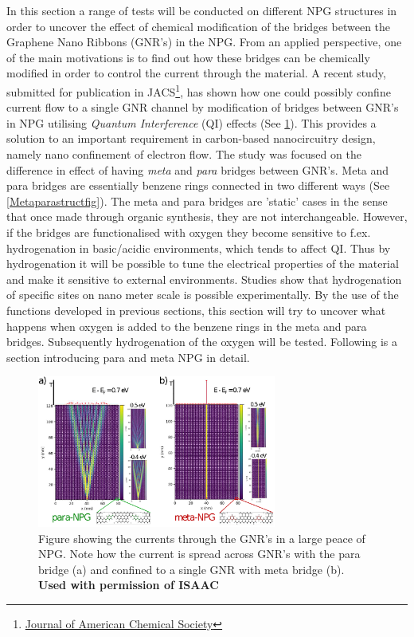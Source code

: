In this section a range of tests will be conducted on different NPG structures in order to uncover the effect of chemical modification of the bridges between the Graphene Nano Ribbons (GNR's) in the NPG. From an applied perspective, one of the main motivations is to find out how these bridges can be chemically modified in order to control the current through the material. A recent study\cite{unpub}, submitted for publication in JACS\footnote{\href{https://pubs.acs.org/journal/jacsat}{Journal of American Chemical Society}}, has shown how one could possibly confine current flow to a single GNR channel by modification of bridges between GNR's in NPG utilising \textit{Quantum Interference} (QI) effects (See \cref{studyfig3}). This provides a solution to an important requirement in carbon-based nanocircuitry design, namely nano confinement of electron flow. The study was focused on the difference in effect of having \textit{meta} and \textit{para} bridges between GNR's. Meta and para bridges are essentially benzene rings connected in two different ways (See \cref{Metaparastructfig}). The meta and para bridges are 'static' cases in the sense that once made through organic synthesis, they are not interchangeable. However, if the bridges are functionalised with oxygen they become sensitive to f.ex. hydrogenation in basic/acidic environments, which tends to affect QI. Thus by hydrogenation it will be possible to tune the electrical properties of the material and make it sensitive to external environments. Studies\cite{li_single_2019} show that hydrogenation of specific sites on nano meter scale is possible experimentally. By the use of the functions developed in previous sections, this section will try to uncover what happens when oxygen is added to the benzene rings in the meta and para bridges. Subsequently hydrogenation of the oxygen will be tested. Following is a section introducing para and meta NPG in detail.
\begin{figure}[h]
		\centering
		\includegraphics[width = 0.7\textwidth]{Figures/Fig_3.eps}
		\caption{Figure showing the currents through the GNR's in a large peace of NPG. Note how the current is spread across GNR's with the para bridge (a) and confined to a single GNR with meta bridge (b). \textbf{Used with permission of ISAAC}}
		\label{studyfig3}
	\end{figure}
